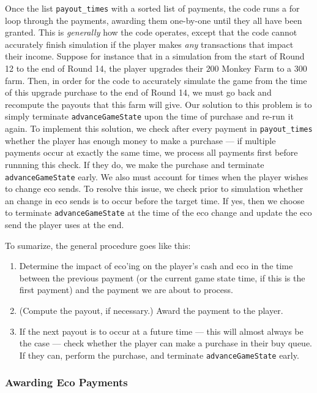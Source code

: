 \documentclass[12pt,letterpaper]{article}
\theoremstyle{remark}
\theoremstyle{plain}
\begin{document}
Once the list \texttt{payout\_times} with a sorted list of payments, the code runs a for loop through the payments, awarding them one-by-one until they all have been granted. This is \textit{generally} how the code operates, except that the code cannot accurately finish simulation if the player makes \textit{any} transactions that impact their income. Suppose for instance that in a simulation from the start of Round 12 to the end of Round 14, the player upgrades their $200$ Monkey Farm to a $300$ farm. Then, in order for the code to accurately simulate the game from the time of this upgrade purchase to the end of Round 14, we must go back and recompute the payouts that this farm will give. Our solution to this problem is to simply terminate \texttt{advanceGameState} upon the time of purchase and re-run it again. To implement this solution, we check after every payment in \texttt{payout\_times} whether the player has enough money to make a purchase --- if multiple payments occur at exactly the same time, we process all payments first before runnning this check. If they do, we make the purchase and terminate \texttt{advanceGameState} early. We also must account for times when the player wishes to change eco sends. To resolve this issue, we check prior to simulation whether an change in eco sends is to occur before the target time. If yes, then we choose to terminate \texttt{advanceGameState} at the time of the eco change and update the eco send the player uses at the end.

To sumarize, the general procedure goes like this:

\begin{enumerate}
    \item Determine the impact of eco'ing on the player's cash and eco in the time between the previous payment (or the current game state time, if this is the first payment) and the payment we are about to process.
    \item (Compute the payout, if necessary.) Award the payment to the player.
    \item If the next payout is to occur at a future time --- this will almost always be the case --- check whether the player can make a purchase in their buy queue. If they can, perform the purchase, and terminate \texttt{advanceGameState} early.
\end{enumerate}

\subsubsection{Awarding Eco Payments}
\end{document}
